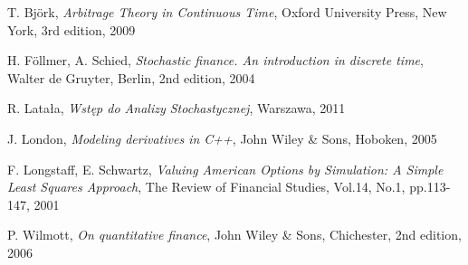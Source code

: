 \documentclass[a4paper,11pt, twoside]{book}
\theoremstyle{definition}
\theoremstyle{remark}
\begin{document}
\begin{thebibliography}{99}

T. Bj\"{o}rk, \emph{Arbitrage Theory in Continuous Time}, Oxford University Press,  New York, 3rd edition, 2009

H. F\"{o}llmer, A. Schied, \emph{Stochastic finance. An introduction in discrete time}, Walter de Gruyter, Berlin, 2nd edition, 2004

R. Latała, \emph{Wstęp do Analizy Stochastycznej}, Warszawa, 2011

J. London, \emph{Modeling derivatives in C++}, John Wiley \& Sons, Hoboken, 2005

F. Longstaff, E. Schwartz, \emph{Valuing American Options by Simulation: A Simple Least Squares Approach}, The Review of Financial Studies, Vol.14, No.1, pp.113-147, 2001

P. Wilmott, \emph{On quantitative finance}, John Wiley \& Sons, Chichester, 2nd edition, 2006

\end{thebibliography}
\end{document}
